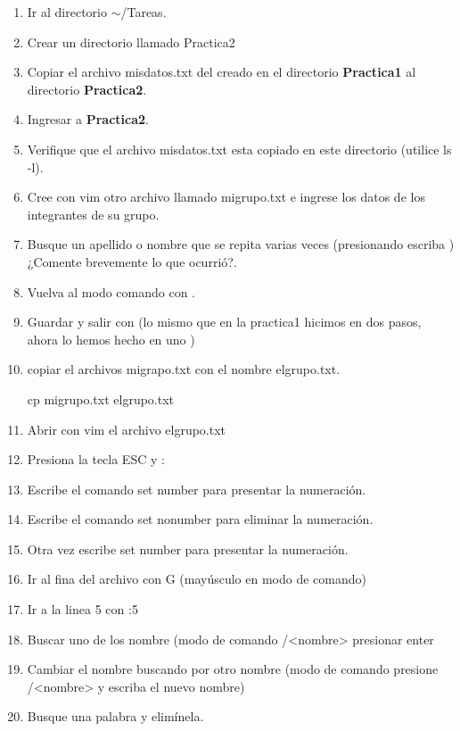 \documentclass[a4paper,12pt,spanish]{article}
\begin{document}
\begin{enumerate}
  \item Ir al directorio $\sim$/Tareas.
  \item Crear un directorio llamado Practica2
  \item Copiar el archivo misdatos.txt del creado en el directorio \textbf{Practica1} al
  directorio \textbf{Practica2}.
  \item Ingresar a \textbf{Practica2}.
  \item Verifique que el archivo misdatos.txt esta copiado en este
  directorio (utilice ls -l).
  \item Cree con vim otro archivo llamado migrupo.txt e ingrese los
  datos de los integrantes de su grupo.
  \item Busque un apellido o nombre que se repita varias
  veces (presionando  escriba  ) ¿Comente brevemente lo que
  ocurrió?.
  \item Vuelva al modo comando con .
  \item Guardar y salir con  \fbox{\Large :} (lo mismo que en la practica1 hicimos en
  dos pasos, ahora lo hemos hecho en uno )
  \item copiar el archivos migrapo.txt con el nombre  elgrupo.txt.
    \begin{tcolorbox}[colback=gray!5]
   cp migrupo.txt  elgrupo.txt
  \end{tcolorbox}
  \item Abrir con vim el archivo elgrupo.txt
  \item Presiona la tecla ESC y :
  \item Escribe el comando set number para presentar la numeración.
  \item Escribe el comando set nonumber para eliminar la numeración.
  \item Otra vez escribe set number para presentar la numeración.
  \item Ir al fina del archivo  con G (mayúsculo en modo de comando)
  \item Ir a la linea 5 con :5
  \item Buscar uno de los nombre (modo de comando /<nombre>  presionar
  enter
  \item Cambiar el nombre buscando por otro nombre (modo de comando
  presione /<nombre> y escriba el nuevo nombre)
  \item Busque una palabra y elimínela.
\end{enumerate}
\end{document}
